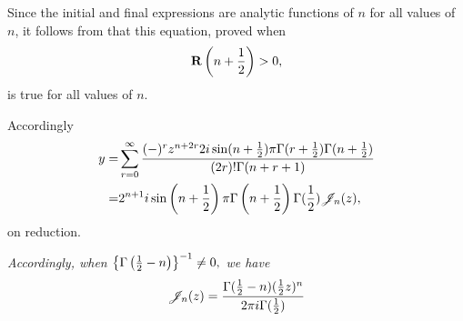 \documentclass{book}
\begin{document}
Since the initial and final expressions are analytic functions of $n$
for all values of $n$, it follows from  that this
equation, proved when
$$
\operatorname{\mathbf{R}} \left(  n + \frac{1}{2}  \right) > 0,
$$
is true for all values of $n$.

Accordingly
\begin{align*}
  y
  =&
  \sum_{r=0}^{\infty}
  \frac{(-)^r z^{n+2r} 2i \sin(n+\frac{1}{2}) \pi \Gamma(r+\frac{1}{2})
    \Gamma(n+\frac{1}{2})}{ (2r)! \Gamma(n+r+1)}
  \\
  =&
  2^{n+1}
  i
  \sin\left( n+\frac{1}{2} \right)
  \pi
  \Gamma\left( n+\frac{1}{2} \right)
  \Gamma(\frac{1}{2})
  \mathscr{J}_n(z),
\end{align*}
on reduction.

\emph{Accordingly, when
  $
  \left\{ \Gamma\left( \frac{1}{2}-n \right) \right\}^{-1} \neq 0,
  $
  we have
}
$$
\mathscr{J}_n(z)
=
\frac{ \Gamma(\frac{1}{2}-n) (\frac{1}{2} z)^n }{ 2\pi i \Gamma(\frac{1}{2})}
$$
\end{document}

